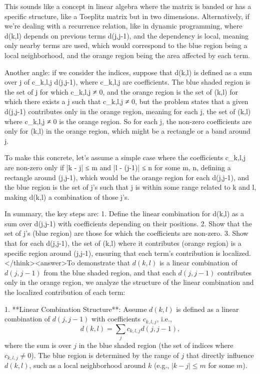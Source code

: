 This sounds like a concept in linear algebra where the matrix is banded or has a specific structure, like a Toeplitz matrix but in two dimensions. Alternatively, if we're dealing with a recurrence relation, like in dynamic programming, where d(k,l) depends on previous terms d(j,j-1), and the dependency is local, meaning only nearby terms are used, which would correspond to the blue region being a local neighborhood, and the orange region being the area affected by each term. 

Another angle: if we consider the indices, suppose that d(k,l) is defined as a sum over j of c_{k,l,j} d(j,j-1), where c_{k,l,j} are coefficients. The blue shaded region is the set of j for which c_{k,l,j} ≠ 0, and the orange region is the set of (k,l) for which there exists a j such that c_{k,l,j} ≠ 0, but the problem states that a given d(j,j-1) contributes only in the orange region, meaning for each j, the set of (k,l) where c_{k,l,j} ≠ 0 is the orange region. So for each j, the non-zero coefficients are only for (k,l) in the orange region, which might be a rectangle or a band around j. 

To make this concrete, let's assume a simple case where the coefficients c_{k,l,j} are non-zero only if |k - j| ≤ m and |l - (j-1)| ≤ n for some m, n, defining a rectangle around (j,j-1), which would be the orange region for each d(j,j-1), and the blue region is the set of j's such that j is within some range related to k and l, making d(k,l) a combination of those j's. 

In summary, the key steps are: 1. Define the linear combination for d(k,l) as a sum over d(j,j-1) with coefficients depending on their positions. 2. Show that the set of j's (blue region) are those for which the coefficients are non-zero. 3. Show that for each d(j,j-1), the set of (k,l) where it contributes (orange region) is a specific region around (j,j-1), ensuring that each term's contribution is localized.</think><answer>To demonstrate that \( d(k,l) \) is a linear combination of \( d(j,j-1) \) from the blue shaded region, and that each \( d(j,j-1) \) contributes only in the orange region, we analyze the structure of the linear combination and the localized contribution of each term:  

1. **Linear Combination Structure**:  
   Assume \( d(k,l) \) is defined as a linear combination of \( d(j,j-1) \) with coefficients \( c_{k,l,j} \), i.e.,  
   \[
   d(k,l) = \sum_{j} c_{k,l,j} d(j,j-1),
   \]  
   where the sum is over \( j \) in the blue shaded region (the set of indices where \( c_{k,l,j} \neq 0 \)). The blue region is determined by the range of \( j \) that directly influence \( d(k,l) \), such as a local neighborhood around \( k \) (e.g., \( |k - j| \leq m \) for some \( m \)).  

